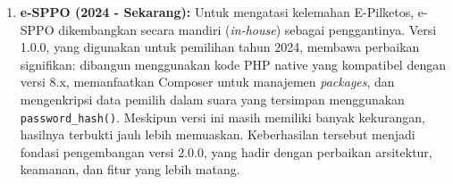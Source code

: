 \begin{enumerate}
	\item \textbf{e-SPPO (2024 - Sekarang):} Untuk mengatasi kelemahan E-Pilketos, e-SPPO dikembangkan secara mandiri (\textit{in-house}) sebagai penggantinya. Versi 1.0.0, yang digunakan untuk pemilihan tahun 2024, membawa perbaikan signifikan: dibangun menggunakan kode PHP native yang kompatibel dengan versi 8.x, memanfaatkan Composer untuk manajemen \textit{packages}, dan mengenkripsi data pemilih dalam suara yang tersimpan menggunakan \texttt{password\_hash()}. Meskipun versi ini masih memiliki banyak kekurangan, hasilnya terbukti jauh lebih memuaskan. Keberhasilan tersebut menjadi fondasi pengembangan versi 2.0.0, yang hadir dengan perbaikan arsitektur, keamanan, dan fitur yang lebih matang.
\end{enumerate}


